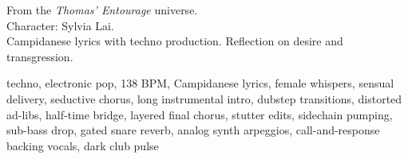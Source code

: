 

\begin{notes}
From the \emph{Thomas’ Entourage} universe.\\
Character: Sylvia Lai.\\
Campidanese lyrics with techno production. %
Reflection on desire and transgression.
\end{notes}

\begin{style}
techno, electronic pop, 138 BPM, Campidanese lyrics, female whispers, sensual delivery, seductive chorus, long instrumental intro, dubstep transitions, distorted ad-libs, half-time bridge, layered final chorus, stutter edits, sidechain pumping, sub-bass drop, gated snare reverb, analog synth arpeggios, call-and-response backing vocals, dark club pulse
\end{style}

